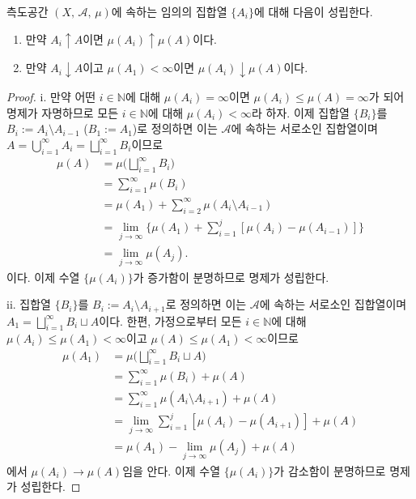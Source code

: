 \begin{theorem}\label{thm:monoSeriesMeasure}
    측도공간 $(X,\,\mathcal{A},\,\mu)$에 속하는 임의의 집합열 $\{A_i\}$에 대해 다음이 성립한다.
    \begin{enumerate}
        \item 만약 $A_i\uparrow A$이면 $\mu(A_i)\uparrow\mu(A)$이다.
        \item 만약 $A_i\downarrow A$이고 $\mu(A_1)<\infty$이면 $\mu(A_i)\downarrow\mu(A)$이다.
    \end{enumerate}
\end{theorem}

\begin{proof}
    i. 만약 어떤 $i\in\mathbb{N}$에 대해 $\mu(A_i)=\infty$이면 $\mu(A_i)\leq\mu(A)=\infty$가 되어 명제가 자명하므로  모든 $i\in\mathbb{N}$에 대해 $\mu(A_i)<\infty$라 하자. 이제 집합열 $\{B_i\}$를 $B_i:=A_i\setminus A_{i-1}$ ($B_1:=A_1$)로 정의하면 이는 $\mathcal{A}$에 속하는 서로소인 집합열이며 $A=\bigcup_{i=1}^\infty A_i=\bigsqcup_{i=1}^\infty B_i$이므로
    \begin{align*}
        \mu(A)&=\mu\bigg(\bigsqcup_{i=1}^\infty B_i\bigg)\\
        &=\sum_{i=1}^\infty\mu(B_i)\\
        &=\mu(A_1)+\sum_{i=2}^\infty\mu(A_i\setminus A_{i-1})\\
        &=\lim_{j\to\infty}\bigg\{\mu(A_1)+\sum_{i=1}^j[\mu(A_i)-\mu(A_{i-1})]\bigg\}\\
        &=\lim_{j\to\infty}\mu(A_j).
    \end{align*}
    이다. 이제 수열 $\{\mu(A_i)\}$가 증가함이 분명하므로 명제가 성립한다.

    ii. 집합열 $\{B_i\}$를 $B_i:=A_i\setminus A_{i+1}$로 정의하면 이는 $\mathcal{A}$에 속하는 서로소인 집합열이며 $A_1=\bigsqcup_{i=1}^\infty B_i\sqcup A$이다. 한편, 가정으로부터 모든 $i\in\mathbb{N}$에 대해 $\mu(A_i)\leq\mu(A_1)<\infty$이고 $\mu(A)\leq\mu(A_1)<\infty$이므로
    \begin{align*}
        \mu(A_1)&=\mu\bigg(\bigsqcup_{i=1}^\infty B_i\sqcup A\bigg)\\
        &=\sum_{i=1}^\infty\mu(B_i)+\mu(A)\\
        &=\sum_{i=1}^\infty\mu(A_i\setminus A_{i+1})+\mu(A)\\
        &=\lim_{j\to\infty}\sum_{i=1}^j[\mu(A_i)-\mu(A_{i+1})]+\mu(A)\\
        &=\mu(A_1)-\lim_{j\to\infty}\mu(A_j)+\mu(A)
    \end{align*}
    에서 $\mu(A_i)\to\mu(A)$임을 안다. 이제 수열 $\{\mu(A_i)\}$가 감소함이 분명하므로 명제가 성립한다.
\end{proof}

